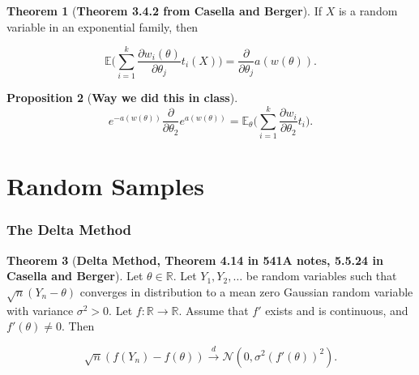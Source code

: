 \documentclass{article}
\newcommand{\pderiv}[2]{\frac{\partial #1}{\partial #2}}
\newcommand{\E}{\mathbb{E}}
\theoremstyle{definition}
\newtheorem{theorem}{Theorem}
\theoremstyle{definition}
\newtheorem{proposition}[theorem]{Proposition}
\theoremstyle{definition}
\theoremstyle{definition}
\theoremstyle{definition}
\theoremstyle{definition}
\theoremstyle{definition}
\begin{document}
\begin{theorem}[\textbf{Theorem 3.4.2 from Casella and Berger}] If \(X\) is a random variable in an exponential family, then

\begin{equation}\label{prob.thm.3.4.2.casella}
\E \Bigg( \sum_{i=1}^k \pderiv{w_i(\theta)}{\theta_j} t_i(X) \Bigg) =  \pderiv{}{\theta_j}  a(w(\theta)).
\end{equation}

\end{theorem}

\begin{proposition}[\textbf{Way we did this in class}]

\begin{equation}\label{prob.541a.hw3.6a.f}
 e^{-a(w(\theta))} \pderiv{}{\theta_2} e^{a(w(\theta))}  = \E_\theta \big( \sum_{i=1}^k \pderiv{w_i}{\theta_2} t_i \big).
\end{equation}

\end{proposition}


\section{Random Samples}

\subsubsection{The Delta Method}

\begin{theorem}[\textbf{Delta Method, Theorem 4.14 in 541A notes, 5.5.24 in Casella and Berger}]\label{mathstats.delta.method.thm} Let \(\theta \in \mathbb{R}\). Let \(Y_1, Y_2, \ldots\) be random variables such that \(\sqrt{n}(Y_n - \theta)\) converges in distribution to a mean zero Gaussian random variable with variance \(\sigma^2 > 0\). Let \(f: \mathbb{R} \to \mathbb{R}\). Assume that \(f'\) exists and is continuous, and \(f'(\theta) \neq 0\). Then

\[
\sqrt{n}(f(Y_n) - f(\theta)) \xrightarrow{d} \mathcal{N}(0, \sigma^2(f'(\theta))^2).
\]


\end{theorem}
\end{document}

